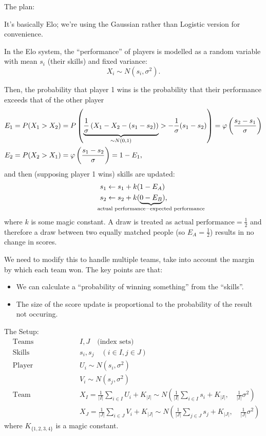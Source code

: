 \documentclass{article}
\begin{document}
The plan:

It's basically Elo; we're using the Gaussian rather than Logistic version for convenience.

In the Elo system, the ``performance'' of players is modelled as a random variable with mean $s_i$ (their skills) and fixed variance:
\[
    X_i \sim N(s_i, \sigma^2)
    \text{.}
\]

Then, the probability that player 1 wins is the probability that their performance exceeds that of the other player
\begin{align*}
    E_1 &= P(X_1 > X_2) = P \left( \underbrace{ \frac{1}{\sigma} \left( X_1 - X_2 - (s_1 - s_2) \right) }_{\mathclap{\sim N(0, 1)}}
                        > - \frac{1}{\sigma} (s_1 - s_2) \right)
         = \varphi\left( \frac{s_2 - s_1}{\sigma} \right) \\
    E_2 &= P(X_2 > X_1) = \varphi\left( \frac{s_1 - s_2}{\sigma} \right) = 1 - E_1
    \text{,}
\end{align*}
and then (supposing player 1 wins) skills are updated:
\begin{align*}
    s_1 &\leftarrow s_1 + k ( 1 - E_A ) \\
    s_2 &\leftarrow s_2 + k ( \underbrace{0 - E_B}_{\mathclap{\text{actual performance} - \text{expected performance}}} )
    \text{,}
\end{align*}
where $k$ is some magic constant. A draw is treated as $\text{actual performance} = \frac{1}{2}$ and therefore a draw between two equally matched people (so $E_A = \frac{1}{2}$) results in no change in scores.

We need to modify this to handle multiple teams, take into account the margin by which each team won. The key points are that:
\begin{itemize}
    \item We can calculate a ``probability of winning something'' from the ``skills''.
    \item The size of the score update is proportional to the probability of the result not occuring.
\end{itemize}

The Setup:
\begin{align*}
    &\text{Teams } && I, J \quad\text{(index sets)} \\
    &\text{Skills } && s_i, s_j \quad (i \in I, j \in J) \\
    &\text{Player performance } && U_i \sim N(s_i, \sigma^2) \\
    &                           && V_i \sim N(s_j, \sigma^2) \\
    &\text{Team performance } && X_I = \frac{1}{|I|} \sum_{i \in I} U_i + K_{|I|} \sim N\left( \frac{1}{|I|} \sum_{i \in I} s_i + K_{|I|}, \quad \frac{1}{|I|} \sigma^2 \right) \\
    &                         && X_J = \frac{1}{|J|} \sum_{i \in J} V_i + K_{|J|} \sim N\left( \frac{1}{|J|} \sum_{j \in J} s_j + K_{|J|}, \quad  \frac{1}{|J|} \sigma^2 \right)
\end{align*}
where $K_{\{1,2,3,4\}}$ is a magic constant.
\end{document}
